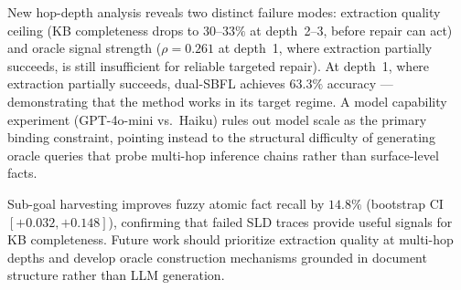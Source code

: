 \documentclass[11pt,letterpaper]{article}
\begin{document}
New hop-depth analysis reveals two distinct failure modes: extraction quality ceiling (KB completeness drops to $30$--$33\%$ at depth~2--3, before repair can act) and oracle signal strength ($\rho = 0.261$ at depth~1, where extraction partially succeeds, is still insufficient for reliable targeted repair). At depth~1, where extraction partially succeeds, dual-SBFL achieves $63.3\%$ accuracy — demonstrating that the method works in its target regime. A model capability experiment (GPT-4o-mini vs.\ Haiku) rules out model scale as the primary binding constraint, pointing instead to the structural difficulty of generating oracle queries that probe multi-hop inference chains rather than surface-level facts.

Sub-goal harvesting improves fuzzy atomic fact recall by $14.8\%$ (bootstrap CI $[+0.032, +0.148]$), confirming that failed SLD traces provide useful signals for KB completeness. Future work should prioritize extraction quality at multi-hop depths and develop oracle construction mechanisms grounded in document structure rather than LLM generation.



\end{document}
